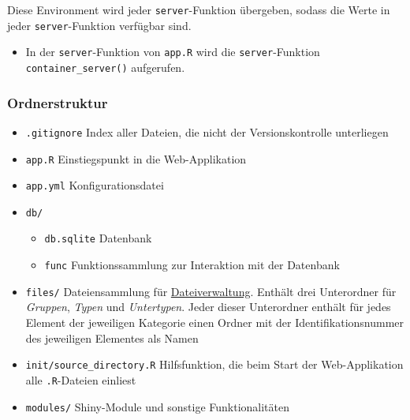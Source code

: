 \documentclass[
]{article}
\providecommand{\tightlist}{%
  \setlength{\itemsep}{0pt}\setlength{\parskip}{0pt}}
\begin{document}
Diese Environment wird jeder \texttt{server}-Funktion übergeben, sodass die Werte in jeder \texttt{server}-Funktion verfügbar sind.

\begin{itemize}
\tightlist
\item
  In der \texttt{server}-Funktion von \texttt{app.R} wird die \texttt{server}-Funktion \texttt{container\_server()} aufgerufen.
\end{itemize}

\hypertarget{ordnerstruktur}{%
\subsubsection{Ordnerstruktur}\label{ordnerstruktur}}

\begin{itemize}
\tightlist
\item
  \texttt{.gitignore} Index aller Dateien, die nicht der Versionskontrolle unterliegen
\item
  \texttt{app.R} Einstiegspunkt in die Web-Applikation
\item
  \texttt{app.yml} Konfigurationsdatei
\item
  \texttt{db/}

  \begin{itemize}
  \tightlist
  \item
    \texttt{db.sqlite} Datenbank
  \item
    \texttt{func} Funktionssammlung zur Interaktion mit der Datenbank
  \end{itemize}
\item
  \texttt{files/} Dateiensammlung für \protect\hyperlink{file-management}{Dateiverwaltung}. Enthält drei Unterordner für \emph{Gruppen}, \emph{Typen} und \emph{Untertypen}. Jeder dieser Unterordner enthält für jedes Element der jeweiligen Kategorie einen Ordner mit der Identifikationsnummer des jeweiligen Elementes als Namen
\item
  \texttt{init/source\_directory.R} Hilfsfunktion, die beim Start der Web-Applikation alle \texttt{.R}-Dateien einliest
\item
  \texttt{modules/} Shiny-Module und sonstige Funktionalitäten


\end{itemize}
\end{document}
